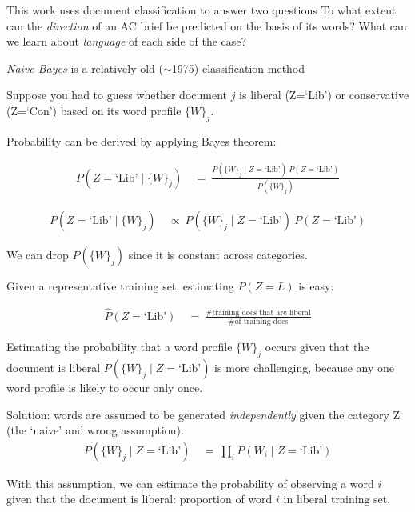 \documentclass{mediumfoils}
\begin{document}

This work uses document classification to answer two questions
\ita
\itm To what extent can the \textsl{direction} of an AC brief be predicted on the basis of its words?
\itm What can we learn about \textsl{language} of each side of the case? 
\itz


\textsl{Naive Bayes} is a relatively old ($\sim$1975)  classification method

Suppose you had to guess  whether document $j$ is liberal (Z=`Lib') or conservative (Z=`Con') based on its word profile $\{W\}_j$.

Probability can be derived by applying Bayes theorem:

\begin{align*}
P(Z=\text{`Lib'} \mid \{W\}_j) &~=~ \frac{P(\{W\}_j \mid Z=\text{`Lib'})~P(Z=\text{`Lib'})}{P(\{W\}_j)}
\end{align*}


\begin{align*}
P(Z=\text{`Lib'} \mid \{W\}_j) &~\propto~ P(\{W\}_j \mid Z=\text{`Lib'})~P(Z=\text{`Lib'})
\end{align*}

We can drop $P(\{W\}_j)$ since it is constant across categories. 

Given a representative training set, estimating $P(Z=L)$ is easy: 

\begin{align*}
\hat{P}(Z=\text{`Lib'})&~=~ \frac{\text{\# training docs that are liberal}}
{\text{\# of training docs}}
\end{align*}


Estimating the probability that a word profile $\{W\}_j$ occurs given that the document is liberal $P(\{W\}_j\mid Z=\text{`Lib'})$ is more challenging, because any one word profile is likely to occur only once.

Solution: 
\ita
\itm words are assumed to be generated \textit{independently} given the category Z (the `naive' and wrong assumption). 
\begin{align*}
P(\{W\}_j \mid Z=\text{`Lib'}) &~=~ {\prod}_i P(W_i \mid Z=\text{`Lib'})
\end{align*}
\itz
\newpage


With this assumption, we can estimate the probability of observing a word $i$  given that the document is liberal: proportion of word $i$ in liberal training set.
\end{document}

